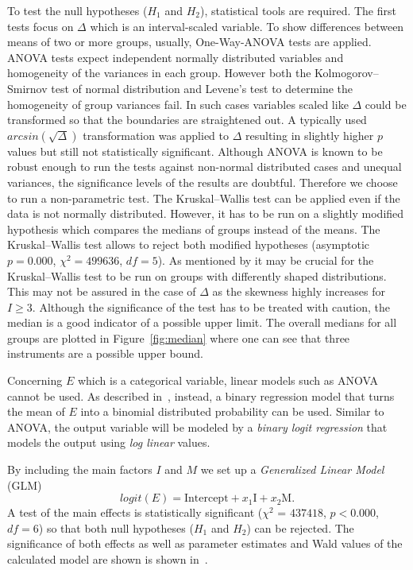 To test the null hypotheses ($H_1$ and $H_2$), statistical tools are required.
The first tests focus on $\Delta$ which is an interval-scaled variable. To show differences between means of two or more groups, usually, One-Way-ANOVA tests are applied. ANOVA tests expect independent normally distributed variables and homogeneity of the variances in each group. However both the Kolmogorov--Smirnov test of normal distribution and Levene's test to determine the homogeneity of group variances fail. In such cases variables scaled like $\Delta$ could be transformed so that the boundaries are straightened out. A typically used $arcsin(\sqrt{\Delta})$ transformation was applied to $\Delta$ resulting in slightly higher $p$ values but still not statistically significant. Although ANOVA is known to be robust enough to run the tests against non-normal distributed cases and unequal variances, the significance levels of the results are doubtful. Therefore we choose to run a non-parametric test. The Kruskal--Wallis test can be applied even if the data is not normally distributed. However, it has to be run on a slightly modified hypothesis which compares the medians of groups instead of the means. The Kruskal--Wallis test allows to reject both modified hypotheses (asymptotic $p = 0.000$, $\chi^2 = 499636$, $df=5$).
As mentioned by \cite{fagerland2009} it may be crucial for the Kruskal--Wallis test to be run on groups with differently shaped distributions.
This may not be assured in the case of $\Delta$ as the skewness highly increases for $I \geq 3$. Although the significance of the test has to be treated with caution, the median is a good indicator of a possible upper limit. The overall medians for all groups are plotted in Figure~\ref{fig:median} where one can see that three instruments are a possible upper bound.
\par
Concerning $E$ which is a categorical variable, linear models such as ANOVA cannot be used.
As described in~\cite{jaeger08}, instead, a binary regression model that turns the mean of $E$ into a binomial distributed probability can be used.
Similar to ANOVA, the output variable will be modeled by a \emph{binary logit regression} that models the output using \emph{log linear} values.
\par
By including the main factors $I$ and $M$ we set up a \emph{Generalized Linear Model} (GLM)
\begin{equation}
    logit(E) =  \text{Intercept} + x_1 \text{I} + x_2 \text{M} .
    \label{eq:logit_main}
\end{equation}
A test of the main effects is statistically significant ($\chi^2$ = $437418$, $p < 0.000$, $df = 6$) so that both null hypotheses ($H_1$ and $H_2$) can be rejected. The significance of both effects as well as parameter estimates and Wald values of the calculated model are shown is shown in~\cite{stoeter13}.
